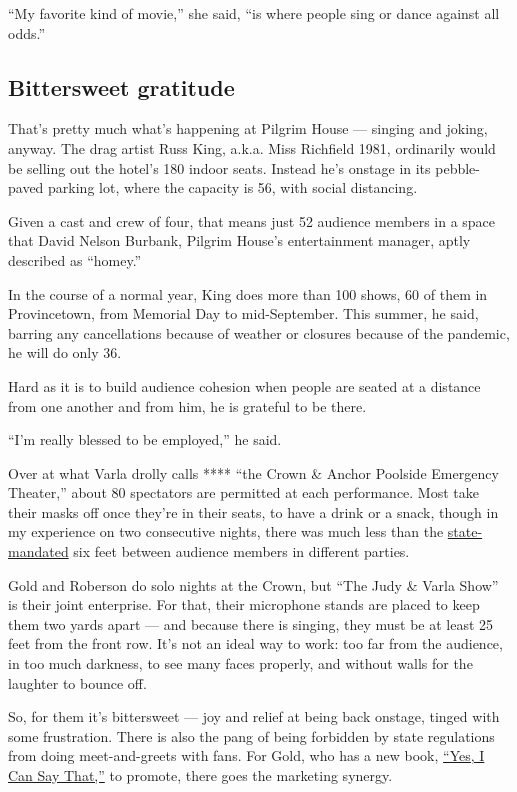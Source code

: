 ``My favorite kind of movie,'' she said, ``is where people sing or dance
against all odds.''

\hypertarget{bittersweet-gratitude}{%
\subsection{Bittersweet gratitude}\label{bittersweet-gratitude}}

That's pretty much what's happening at Pilgrim House --- singing and
joking, anyway. The drag artist Russ King, a.k.a. Miss Richfield 1981,
ordinarily would be selling out the hotel's 180 indoor seats. Instead
he's onstage in its pebble-paved parking lot, where the capacity is 56,
with social distancing.

Given a cast and crew of four, that means just 52 audience members in a
space that David Nelson Burbank, Pilgrim House's entertainment manager,
aptly described as ``homey.''

In the course of a normal year, King does more than 100 shows, 60 of
them in Provincetown, from Memorial Day to mid-September. This summer,
he said, barring any cancellations because of weather or closures
because of the pandemic, he will do only 36.

Hard as it is to build audience cohesion when people are seated at a
distance from one another and from him, he is grateful to be there.

``I'm really blessed to be employed,'' he said.

Over at what Varla drolly calls **** ``the Crown \& Anchor Poolside
Emergency Theater,'' about 80 spectators are permitted at each
performance. Most take their masks off once they're in their seats, to
have a drink or a snack, though in my experience on two consecutive
nights, there was much less than the
\href{https://www.mass.gov/info-details/safety-standards-and-checklist-theaters-and-performance-venues}{state-mandated}
six feet between audience members in different parties.

Gold and Roberson do solo nights at the Crown, but ``The Judy \& Varla
Show'' is their joint enterprise. For that, their microphone stands are
placed to keep them two yards apart --- and because there is singing,
they must be at least 25 feet from the front row. It's not an ideal way
to work: too far from the audience, in too much darkness, to see many
faces properly, and without walls for the laughter to bounce off.

So, for them it's bittersweet --- joy and relief at being back onstage,
tinged with some frustration. There is also the pang of being forbidden
by state regulations from doing meet-and-greets with fans. For Gold, who
has a new book,
\href{https://www.harpercollins.com/products/yes-i-can-say-that-judy-gold}{``Yes,
I Can Say That,''} to promote, there goes the marketing synergy.

